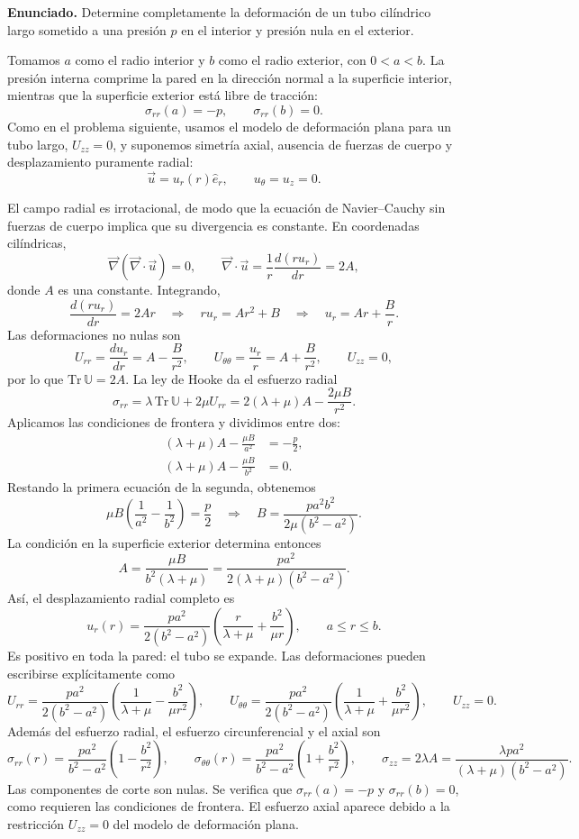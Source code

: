 \textbf{Enunciado.} Determine completamente la deformación de un tubo cilíndrico largo sometido a una presión $p$ en el interior y presión nula en el exterior.

Tomamos $a$ como el radio interior y $b$ como el radio exterior, con $0<a<b$. La presión interna comprime la pared en la dirección normal a la superficie interior, mientras que la superficie exterior está libre de tracción:
\[
\sigma_{rr}(a)=-p,
\qquad
\sigma_{rr}(b)=0.
\]
Como en el problema siguiente, usamos el modelo de deformación plana para un tubo largo, $U_{zz}=0$, y suponemos simetría axial, ausencia de fuerzas de cuerpo y desplazamiento puramente radial:
\[
\vec u=u_r(r)\hat e_r,
\qquad u_\theta=u_z=0.
\]

El campo radial es irrotacional, de modo que la ecuación de Navier--Cauchy sin fuerzas de cuerpo implica que su divergencia es constante. En coordenadas cilíndricas,
\[
\vec\nabla(\vec\nabla\cdot\vec u)=0,
\qquad
\vec\nabla\cdot\vec u
=\frac{1}{r}\frac{d(ru_r)}{dr}=2A,
\]
donde $A$ es una constante. Integrando,
\[
\frac{d(ru_r)}{dr}=2Ar
\quad\Longrightarrow\quad
ru_r=Ar^2+B
\quad\Longrightarrow\quad
u_r=Ar+\frac{B}{r}.
\]
Las deformaciones no nulas son
\[
U_{rr}=\frac{du_r}{dr}=A-\frac{B}{r^2},
\qquad
U_{\theta\theta}=\frac{u_r}{r}=A+\frac{B}{r^2},
\qquad
U_{zz}=0,
\]
por lo que $\mathrm{Tr}\,\mathbb U=2A$. La ley de Hooke da el esfuerzo radial
\[
\sigma_{rr}
=\lambda\,\mathrm{Tr}\,\mathbb U+2\mu U_{rr}
=2(\lambda+\mu)A-\frac{2\mu B}{r^2}.
\]
Aplicamos las condiciones de frontera y dividimos entre dos:
\[
\begin{aligned}
(\lambda+\mu)A-\frac{\mu B}{a^2}&=-\frac{p}{2},\\
(\lambda+\mu)A-\frac{\mu B}{b^2}&=0.
\end{aligned}
\]
Restando la primera ecuación de la segunda, obtenemos
\[
\mu B\left(\frac{1}{a^2}-\frac{1}{b^2}\right)
=\frac{p}{2}
\quad\Longrightarrow\quad
B=\frac{pa^2b^2}{2\mu(b^2-a^2)}.
\]
La condición en la superficie exterior determina entonces
\[
A=\frac{\mu B}{b^2(\lambda+\mu)}
=\frac{pa^2}{2(\lambda+\mu)(b^2-a^2)}.
\]
Así, el desplazamiento radial completo es
\[
\boxed{
u_r(r)=\frac{pa^2}{2(b^2-a^2)}
\left(\frac{r}{\lambda+\mu}+\frac{b^2}{\mu r}\right),
\qquad a\le r\le b.
}
\]
Es positivo en toda la pared: el tubo se expande. Las deformaciones pueden escribirse explícitamente como
\[
\boxed{
U_{rr}=\frac{pa^2}{2(b^2-a^2)}
\left(\frac{1}{\lambda+\mu}-\frac{b^2}{\mu r^2}\right),
\qquad
U_{\theta\theta}=\frac{pa^2}{2(b^2-a^2)}
\left(\frac{1}{\lambda+\mu}+\frac{b^2}{\mu r^2}\right),
\qquad U_{zz}=0.
}
\]
Además del esfuerzo radial, el esfuerzo circunferencial y el axial son
\[
\boxed{
\sigma_{rr}(r)=\frac{pa^2}{b^2-a^2}
\left(1-\frac{b^2}{r^2}\right),
\qquad
\sigma_{\theta\theta}(r)=\frac{pa^2}{b^2-a^2}
\left(1+\frac{b^2}{r^2}\right),
\qquad
\sigma_{zz}=2\lambda A
=\frac{\lambda pa^2}{(\lambda+\mu)(b^2-a^2)}.
}
\]
Las componentes de corte son nulas. Se verifica que $\sigma_{rr}(a)=-p$ y $\sigma_{rr}(b)=0$, como requieren las condiciones de frontera. El esfuerzo axial aparece debido a la restricción $U_{zz}=0$ del modelo de deformación plana.

